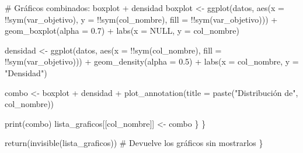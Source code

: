 \documentclass[
  letterpaper,
  DIV=11,
  numbers=noendperiod]{scrartcl}
\newenvironment{Shaded}{\begin{snugshade}}{\end{snugshade}}
\newcommand{\AttributeTok}[1]{\textcolor[rgb]{0.40,0.45,0.13}{#1}}
\newcommand{\CommentTok}[1]{\textcolor[rgb]{0.37,0.37,0.37}{#1}}
\newcommand{\ConstantTok}[1]{\textcolor[rgb]{0.56,0.35,0.01}{#1}}
\newcommand{\FloatTok}[1]{\textcolor[rgb]{0.68,0.00,0.00}{#1}}
\newcommand{\FunctionTok}[1]{\textcolor[rgb]{0.28,0.35,0.67}{#1}}
\newcommand{\NormalTok}[1]{\textcolor[rgb]{0.00,0.23,0.31}{#1}}
\newcommand{\OtherTok}[1]{\textcolor[rgb]{0.00,0.23,0.31}{#1}}
\newcommand{\SpecialCharTok}[1]{\textcolor[rgb]{0.37,0.37,0.37}{#1}}
\newcommand{\StringTok}[1]{\textcolor[rgb]{0.13,0.47,0.30}{#1}}
\begin{document}
\begin{Shaded}
\begin{Highlighting}[]
      \CommentTok{\# Gráficos combinados: boxplot + densidad}
\NormalTok{      boxplot }\OtherTok{\textless{}{-}} \FunctionTok{ggplot}\NormalTok{(datos, }\FunctionTok{aes}\NormalTok{(}\AttributeTok{x =} \SpecialCharTok{!!}\FunctionTok{sym}\NormalTok{(var\_objetivo), }
                                 \AttributeTok{y =} \SpecialCharTok{!!}\FunctionTok{sym}\NormalTok{(col\_nombre),}
                                 \AttributeTok{fill =} \SpecialCharTok{!!}\FunctionTok{sym}\NormalTok{(var\_objetivo))) }\SpecialCharTok{+}
        \FunctionTok{geom\_boxplot}\NormalTok{(}\AttributeTok{alpha =} \FloatTok{0.7}\NormalTok{) }\SpecialCharTok{+}
        \FunctionTok{labs}\NormalTok{(}\AttributeTok{x =} \ConstantTok{NULL}\NormalTok{, }\AttributeTok{y =}\NormalTok{ col\_nombre)}
      
\NormalTok{      densidad }\OtherTok{\textless{}{-}} \FunctionTok{ggplot}\NormalTok{(datos, }\FunctionTok{aes}\NormalTok{(}\AttributeTok{x =} \SpecialCharTok{!!}\FunctionTok{sym}\NormalTok{(col\_nombre), }
                                  \AttributeTok{fill =} \SpecialCharTok{!!}\FunctionTok{sym}\NormalTok{(var\_objetivo))) }\SpecialCharTok{+}
        \FunctionTok{geom\_density}\NormalTok{(}\AttributeTok{alpha =} \FloatTok{0.5}\NormalTok{) }\SpecialCharTok{+}
        \FunctionTok{labs}\NormalTok{(}\AttributeTok{x =}\NormalTok{ col\_nombre, }\AttributeTok{y =} \StringTok{"Densidad"}\NormalTok{)}
      
\NormalTok{      combo }\OtherTok{\textless{}{-}}\NormalTok{ boxplot }\SpecialCharTok{+}\NormalTok{ densidad }\SpecialCharTok{+} 
        \FunctionTok{plot\_annotation}\NormalTok{(}\AttributeTok{title =} \FunctionTok{paste}\NormalTok{(}\StringTok{"Distribución de"}\NormalTok{, col\_nombre))}
      
      \FunctionTok{print}\NormalTok{(combo)}
\NormalTok{      lista\_graficos[[col\_nombre]] }\OtherTok{\textless{}{-}}\NormalTok{ combo}
\NormalTok{    \}}
\NormalTok{  \}}
  
  \FunctionTok{return}\NormalTok{(}\FunctionTok{invisible}\NormalTok{(lista\_graficos))  }\CommentTok{\# Devuelve los gráficos sin mostrarlos}
\NormalTok{\}}
\end{Highlighting}
\end{Shaded}
\end{document}

